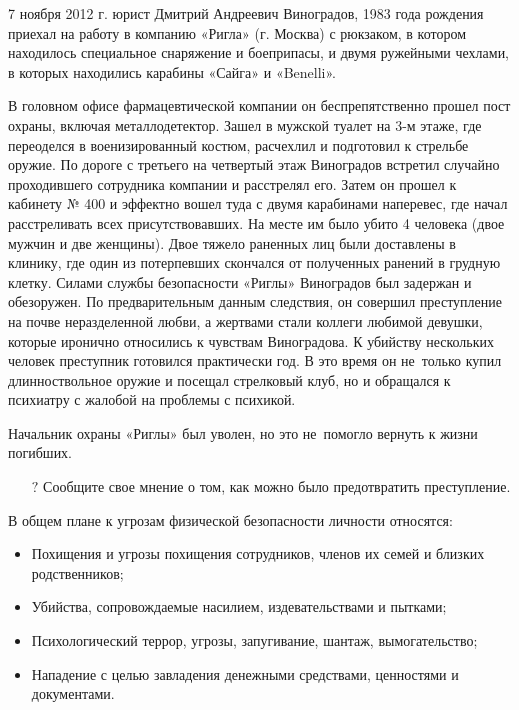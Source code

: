 \documentclass[a4paper,12pt,fleqn]{article} %
\begin{document}
\begin{tcolorbox}[colback=blue!55!red!5!,colframe=blue!55!red,enforce breakable,%
	pad at break=1mm, title=Кейс 28. Действия обиженного сотрудника]
	
	7 ноября 2012 г. юрист Дмитрий Андреевич Виноградов, 1983 года рождения приехал на работу в компанию «Ригла» (г. Москва) с рюкзаком, в котором находилось специальное снаряжение и боеприпасы, и двумя ружейными чехлами, в которых находились карабины «Сайга» и «Benelli».
	
	В головном офисе фармацевтической компании он беспрепятственно прошел пост охраны, включая металлодетектор. Зашел в мужской туалет на 3-м этаже, где переоделся в военизированный костюм, расчехлил и подготовил к стрельбе оружие. По дороге с третьего на четвертый этаж Виноградов встретил случайно проходившего сотрудника компании и расстрелял его. Затем он прошел к кабинету № 400 и эффектно вошел туда с двумя карабинами наперевес, где начал расстреливать всех присутствовавших. На месте им было убито 4 человека (двое мужчин и две женщины). Двое тяжело раненных лиц были доставлены в клинику, где один из потерпевших скончался от полученных ранений в грудную клетку. Силами службы безопасности «Риглы» Виноградов был задержан и обезоружен. По предварительным данным следствия, он совершил преступление на почве неразделенной любви, а жертвами стали коллеги любимой девушки, которые иронично относились к чувствам Виноградова. К убийству нескольких человек преступник готовился практически год. В это время он не~только купил длинноствольное оружие и посещал стрелковый клуб, но и обращался к психиатру с жалобой на проблемы с психикой. 
	
	Начальник охраны «Риглы» был уволен, но это не~помогло вернуть к жизни погибших.

\begin{itemize}
	\item[{\color{blue!55!red}\Huge {  $ ? $}} \quad]   Сообщите свое мнение о том, как можно было предотвратить преступление.
\end{itemize}	
	
\end{tcolorbox}

В общем плане к угрозам физической безопасности личности относятся: 
\begin{itemize}
	\item Похищения и угрозы похищения сотрудников, членов их семей и близких родственников; 
	\item Убийства, сопровождаемые насилием, издевательствами и пытками; 
	\item Психологический террор, угрозы, запугивание, шантаж, вымогательство; 
	\item Нападение с целью завладения денежными средствами, ценностями и документами. 
\end{itemize}
\end{document}
